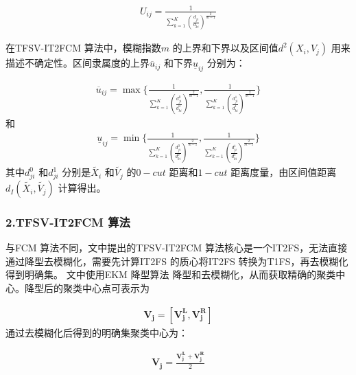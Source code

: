 \begin{equation}\label{eq:12}
    \begin{split}
        U_{ij} = \frac{1}{\sum_{k=1}^K {(\frac{d_{ji}}{d_{ki}})}^{\frac{2}{m-1}}}
    \end{split}
\end{equation}

在TFSV-IT2FCM 算法中，模糊指数$m$ 的上界和下界以及区间值$d^2(X_i,V_j)$ 用来描述不确定性。区间隶属度的上界$\overline{u}_{ij}$ 和下界$\underline{u}_{ij}$ 分别为：

\begin{equation}\label{eq:13}
    \begin{split}
        \overline{u}_{ij} = \max \Bigg \lbrace \frac{1}{\sum_{k=1}^K {(\frac{d_{ji}^0}{d_{ki}^0})}^{\frac{2}{m-1}}}, \frac{1}{\sum_{k=1}^K {(\frac{d_{ji}^1}{d_{ki}^1})}^{\frac{2}{m-1}}} \Bigg \rbrace
    \end{split}
\end{equation}
和
\begin{equation}\label{eq:14}
    \begin{split}
        \underline{u}_{ij} = \min \Bigg \lbrace \frac{1}{\sum_{k=1}^K {(\frac{d_{ji}^0}{d_{ki}^0})}^{\frac{2}{m-1}}}, \frac{1}{\sum_{k=1}^K {(\frac{d_{ji}^1}{d_{ki}^1})}^{\frac{2}{m-1}}} \Bigg \rbrace
    \end{split}
\end{equation}
其中$d_{ji}^0$ 和$d_{ji}^1$ 分别是$\tilde{X_i}$ 和$\tilde{V_j}$ 的$0-cut$ 距离和$1-cut$ 距离度量，由区间值距离$d_{I} (\tilde{X_i}, \tilde{V_j})$ 计算得出。


\subsubsection*{2.TFSV-IT2FCM 算法}
\label{subsubsec::chap04-3-3-2-2}
与FCM 算法不同，文中提出的TFSV-IT2FCM 算法核心是一个IT2FS，无法直接通过降型去模糊化，需要先计算IT2FS 的质心将IT2FS 转换为T1FS，再去模糊化得到明确集\cite{karnik2001centroid}。 文中使用EKM 降型算法\cite{wu2009enhanced} 降型和去模糊化，从而获取精确的聚类中心。降型后的聚类中心点可表示为

\begin{equation}\label{eq:17}
    \begin{split}
        \bm{V_j} = [\bm{V_j^L}, \bm{V_j^R}]
    \end{split}
\end{equation}
通过去模糊化后得到的明确集聚类中心为：

\begin{equation}\label{eq:18}
    \begin{split}
        \bm{V_j} = \frac{\bm{V_j^L}+\bm{V_j^R}}{2}
    \end{split}
\end{equation}


